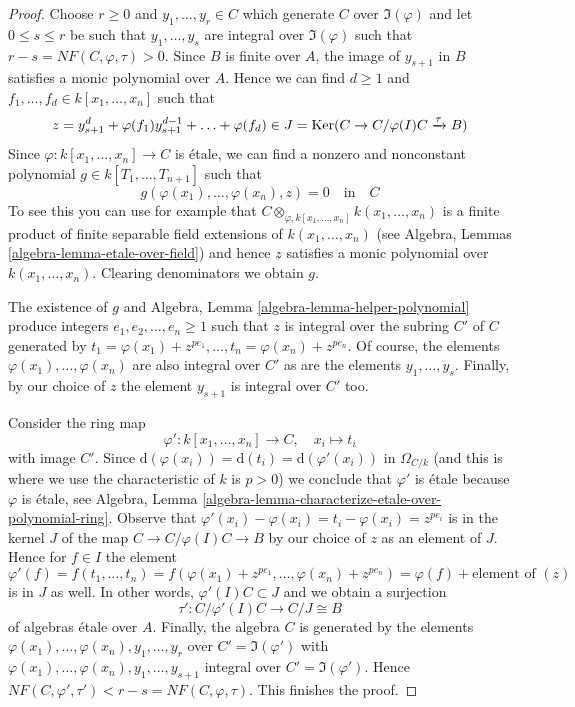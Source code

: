 \begin{proof}
Choose $r \geq 0$ and $y_1, \ldots, y_r \in C$ which generate
$C$ over $\Im(\varphi)$ and let $0 \leq s \leq r$ be such that
$y_1, \ldots, y_s$ are integral over $\Im(\varphi)$
such that $r - s = NF(C, \varphi, \tau) > 0$.
Since $B$ is finite over $A$, the image of $y_{s + 1}$ in $B$
satisfies a monic polynomial over $A$. Hence we can find
$d \geq 1$ and $f_1, \ldots, f_d \in k[x_1, \ldots, x_n]$
such that
$$
z = y_{s + 1}^d + \varphi(f_1) y_{s + 1}^{d - 1} + \ldots + \varphi(f_d) \in
J = \mathop{\mathrm{Ker}}(C \to C/\varphi(I)C \xrightarrow{\tau} B)
$$
Since $\varphi : k[x_1, \ldots, x_n] \to C$ is \'etale, we can find a
nonzero and nonconstant polynomial $g \in k[T_1, \ldots, T_{n + 1}]$
such that
$$
g(\varphi(x_1), \ldots, \varphi(x_n), z) = 0
\quad\text{in}\quad
C
$$
To see this you can use for example that
$C \otimes_{\varphi, k[x_1, \ldots, x_n]} k(x_1, \ldots, x_n)$
is a finite product of finite separable field extensions
of $k(x_1, \ldots, x_n)$
(see Algebra, Lemmas \ref{algebra-lemma-etale-over-field})
and hence $z$ satisfies a monic
polynomial over $k(x_1, \ldots, x_n)$. Clearing denominators
we obtain $g$.

\medskip\noindent
The existence of $g$ and
Algebra, Lemma \ref{algebra-lemma-helper-polynomial}
produce integers $e_1, e_2, \ldots, e_n \geq 1$ such that
$z$ is integral over the subring $C'$ of $C$ generated by
$t_1 = \varphi(x_1) + z^{pe_1}, \ldots, t_n = \varphi(x_n) + z^{pe_n}$.
Of course, the elements $\varphi(x_1), \ldots, \varphi(x_n)$
are also integral over $C'$ as are the elements
$y_1, \ldots, y_s$. Finally, by our choice of $z$ the element
$y_{s + 1}$ is integral over $C'$ too.

\medskip\noindent
Consider the ring map
$$
\varphi' : k[x_1, \ldots, x_n] \longrightarrow C, \quad
x_i \longmapsto t_i
$$
with image $C'$. Since
$\text{d}(\varphi(x_i)) = \text{d}(t_i) = \text{d}(\varphi'(x_i))$
in $\Omega_{C/k}$ (and this is where we use the characteristic of $k$
is $p > 0$) we conclude that $\varphi'$ is \'etale because $\varphi$ is
\'etale, see
Algebra, Lemma \ref{algebra-lemma-characterize-etale-over-polynomial-ring}.
Observe that $\varphi'(x_i) - \varphi(x_i) = t_i - \varphi(x_i) = z^{pe_i}$
is in the kernel $J$ of the map $C \to C/\varphi(I)C \to B$ by our
choice of $z$ as an element of $J$.
Hence for $f \in I$ the element
$$
\varphi'(f) =
f(t_1, \ldots, t_n) =
f(\varphi(x_1) + z^{pe_1}, \ldots, \varphi(x_n) + z^{pe_n}) =
\varphi(f) + \text{element of }(z)
$$
is in $J$ as well. In other words, $\varphi'(I)C \subset J$ and
we obtain a surjection
$$
\tau' : C/\varphi'(I)C \longrightarrow C/J \cong B
$$
of algebras \'etale over $A$. Finally, the algebra
$C$ is generated by the elements
$\varphi(x_1), \ldots, \varphi(x_n), y_1, \ldots, y_r$
over $C' = \Im(\varphi')$ with
$\varphi(x_1), \ldots, \varphi(x_n), y_1, \ldots, y_{s + 1}$
integral over $C' = \Im(\varphi')$. Hence
$NF(C, \varphi', \tau') < r - s = NF(C, \varphi, \tau)$.
This finishes the proof.
\end{proof}

